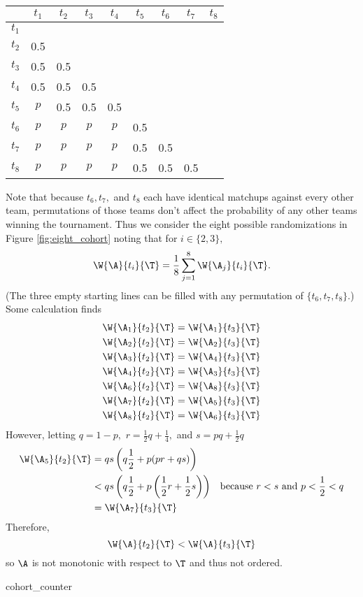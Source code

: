 {{        \begin{center}
            \begin{tabular}{c | c c c c c c c c}
    & $t_1$ & $t_2$ & $t_3$ & $t_4$ & $t_5$ & $t_6$ & $t_7$ & $t_8$\\ 
    \hline
    $t_1$ &  &  &  & & & & &\\
    $t_2$ & 0.5 &  &  &  & & & &\\
    $t_3$ & 0.5 & 0.5 &  &  &  & & &\\
    $t_4$ & 0.5 & 0.5 & 0.5 &  &  & & &\\
    $t_5$ & $p$ & 0.5 & 0.5 & 0.5 & & & &\\
    $t_6$ &  $p$&$p$  & $p$ &  $p$& 0.5 & & &\\
    $t_7$ & $p$ &  $p$& $p$ & $p$ & 0.5 &0.5 & &\\
    $t_8$ & $p$ &  $p$& $p$ & $p$ & 0.5 &0.5 &0.5 &\\
                \end{tabular}
        \end{center}

        Note that because $t_6, t_7,$ and $t_8$ each have identical matchups against every other team, permutations of those teams don't affect the probability of any other teams winning the tournament. Thus we consider the eight possible randomizations in Figure \ref{fig:eight_cohort} noting that for $i \in \{2, 3\},$
        $$\W{\A}{t_i}{\T} = \frac{1}{8}\sum_{j = 1}^8 \W{\A_j}{t_i}{\T}.$$
        (The three empty starting lines can be filled with any permutation of $\{t_6, t_7, t_8\}.$)\\

        Some calculation finds
        \begin{align*}
            \W{\A_1}{t_2}{\T} &= \W{\A_1}{t_3}{\T}\\
            \W{\A_2}{t_2}{\T} &= \W{\A_2}{t_3}{\T}\\
            \W{\A_3}{t_2}{\T} &= \W{\A_4}{t_3}{\T}\\
            \W{\A_4}{t_2}{\T} &= \W{\A_3}{t_3}{\T}\\
            \W{\A_6}{t_2}{\T} &= \W{\A_8}{t_3}{\T}\\
            \W{\A_7}{t_2}{\T} &= \W{\A_5}{t_3}{\T}\\
            \W{\A_8}{t_2}{\T} &= \W{\A_6}{t_3}{\T}
        \end{align*}
        However, letting $q = 1- p,$ $r = \frac{1}{2}q + \frac{1}{4},$ and $s = pq + \frac{1}{2}q$
        \begin{align*}
            \W{\A_5}{t_2}{\T} &= qs\left(q\frac{1}{2}+p(pr + qs)\right)\\
            &<qs\left(q\frac{1}{2}+p\left(\frac{1}{2}r + \frac{1}{2}s\right)\right) &\textrm{because $r < s$ and $p < \frac{1}{2} < q$}\\
            &=\W{\A_7}{t_3}{\T} 
        \end{align*}
        Therefore, $$\W{\A}{t_2}{\T} < \W{\A}{t_3}{\T}$$ so $\A$ is not monotonic with respect to $\T$ and thus not ordered.
    }{cohort_counter}

}

